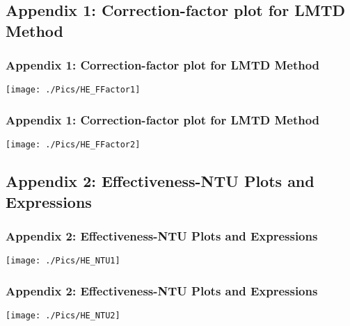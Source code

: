 \documentclass[10pt,compress,handout,ignorenonframetext,unknownkeysallowed]{beamer}
\begin{document}
\subsection{Appendix 1: Correction-factor plot for LMTD Method}\label{appendix1}

\begin{frame}
  \frametitle{Appendix 1: Correction-factor plot for LMTD Method}
    \begin{center}
         \texttt{[image: ./Pics/HE\_FFactor1]}
    \end{center}
\end{frame}

\begin{frame}
  \frametitle{Appendix 1: Correction-factor plot for LMTD Method}
    \begin{center}
         \texttt{[image: ./Pics/HE\_FFactor2]}
    \end{center}
\end{frame}

\subsection{Appendix 2: Effectiveness-NTU Plots and Expressions}\label{appendix2}
\begin{frame}
  \frametitle{Appendix 2: Effectiveness-NTU Plots and Expressions}
    \begin{center}
         \texttt{[image: ./Pics/HE\_NTU1]}
    \end{center}
\end{frame}
\begin{frame}
  \frametitle{Appendix 2: Effectiveness-NTU Plots and Expressions}
    \begin{center}
         \texttt{[image: ./Pics/HE\_NTU2]}
    \end{center}
\end{frame}


%  
\end{document}
